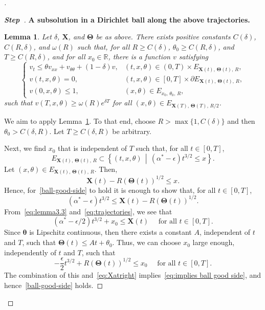 \documentclass[10pt]{amsart}
\newtheorem{lemm}[theo]{Lemma}\newtheorem{prop}[theo]{Proposition}\newtheorem{coro}[theo]{Corollary}\newtheorem{conj}[theo]{Conjecture}
\theoremstyle{definition}\newtheorem{defi}[theo]{Definition}\newtheorem{rema}[theo]{Remark}\newtheorem{exam}[theo]{Example}\newtheorem{exem}[theo]{Example}\newtheorem{nota}[theo]{Notation}
\newcommand{\R}{\mathbb{R}}
\newcommand{\bX}{\mathbf{X}}
\newcommand{\btheta}{\boldsymbol{\theta}}
\newcommand{\bTheta}{\boldsymbol{\Theta}}
\newcommand{\1}{\mathds{1}}
\newcommand{\e}{\epsilon}
\newcounter{stepcount}
\newenvironment{stepl}[1]{\refstepcounter{stepcount}\begin{proof}[\textbf{Step~\thestepcount}]{\bf{#1}}}{\let\qed\relax\end{proof}}
\newenvironment{proofc}[1][\proofname]{\begin{proof}[#1]}{\end{proof}}
\begin{document}
\begin{proofc}
\begin{stepl}{A subsolution in a Dirichlet ball along the above trajectories.}
\begin{lemm}\label{lem:vsubsoln}
Let $\delta$, $\bX$, and $\bTheta$ be as above. There exists positive constants $C(\delta)$, $C(R,\delta)$, and $\omega(R)$ such that, for all $R\geq C(\delta)$, $\theta_0\geq C(R,\delta)$, and $T\geq C(R,\delta)$, and for all $x_0\in \R$, there is a function $v$ satisfying
\begin{equation}\label{eq:v-subsol}
\begin{cases}
v_t \leq \theta v_{xx} + v_{\theta\theta}+(1-\delta)v, & (t,x,\theta) \in (0,T)\times E_{\bX(t),\,\bTheta(t),\,R},
\\[0.10em]
v(t,x,\theta)=0, & (t,x,\theta) \in [0,T]\times \partial E_{\bX(t),\,\bTheta(t),\,R},
\\[0.10em]
v(0,x,\theta) \leq 1, & (x,\theta) \in E_{x_0,\,\theta_0,\,R},
\end{cases}
\end{equation}
such that $v(T,x,\theta) \geq \omega(R) e^{\delta T}$ for all $(x,\theta) \in E_{\bX(T),\,\bTheta(T),\,R/2}$.
\end{lemm}


We aim to apply Lemma~\ref{lem:vsubsoln}. To that end, choose $R>\max\{1,C(\delta)\}$ and then $\theta_0 > C(\delta,R)$. Let $T\geq C(\delta,R)$ be arbitrary.

Next, we find $x_0$ that is independent of $T$ such that, for all $t\in [0,T]$,
\begin{equation}\label{ball-good-side}
E_{\bX(t),\,\bTheta(t),\,R} \subset \left\{(t,x,\theta)\,\middle|\, \left(\alpha^{*}-\e\right)t^{3/2} \leq x \right\}.
\end{equation}
Let $(x, \theta)\in E_{\bX(t),\,\bTheta(t),\,R}$. Then,
\[
\bX(t) - R(\bTheta(t))^{1/2}\leq x.
\]
Hence, for~\eqref{ball-good-side} to hold it is enough to show that, for all $t\in [0,T]$,
\begin{equation}\label{eq:implies ball good side}
\left(\alpha^{*}-\e\right)t^{3/2} \leq \bX(t)-R(\bTheta(t))^{1/2}.
\end{equation}
From~\eqref{eq:lemma3.3} and~\eqref{eq:trajectories}, we see that
\begin{equation}\label{eq:Xatright}
\left(\alpha^*-\e/2\right)t^{3/2} + x_0 \leq \bX(t) \quad \text{ for all }t\in [0,T].
\end{equation}
Since $\btheta$ is Lipschitz continuous, then there exists a constant $A$, independent of $t$ and $T$, such that $\bTheta(t)\leq At+\theta_0$. Thus, we can choose $x_0$ large enough, independently of $t$ and $T$, such that
\[
-\frac{\e}{2}t^{3/2} +R(\bTheta(t))^{1/2} \leq x_0 \quad \text{ for all }t\in [0,T].
\]
The combination of this and~\eqref{eq:Xatright} implies~\eqref{eq:implies ball good side}, and hence~\eqref{ball-good-side} holds.
\end{stepl}



\end{proofc}
\end{document}
